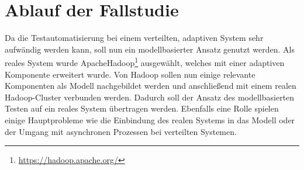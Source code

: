 \chapter{Ablauf der Fallstudie}\label{sec:fallstudie}

Da die Testautomatisierung bei einem verteilten, adaptiven System sehr aufwändig werden kann, soll nun ein modellbasierter Ansatz genutzt werden. Als reales System wurde Apache\texttrademark Hadoop\textregistered\footnote{\url{https://hadoop.apache.org/}} ausgewählt, welches mit einer adaptiven Komponente erweitert wurde. Von Hadoop sollen nun einige relevante Komponenten als Modell nachgebildet werden und anschließend mit einem realen Hadoop-Cluster verbunden werden. Dadurch soll der Ansatz des modellbasierten Testen auf ein reales System übertragen werden. Ebenfalls eine Rolle spielen einige Hauptprobleme wie \zB die Einbindung des realen Systems in das Modell oder der Umgang mit asynchronen Prozessen bei verteilten Systemen.







